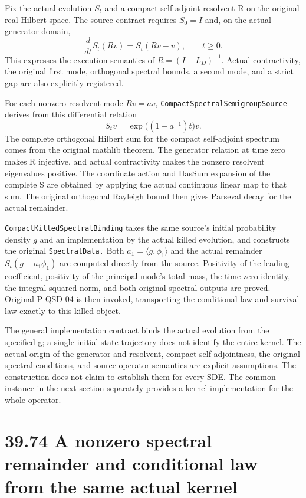 \documentclass[
  english,
  11pt,
  oneside]{book}
\begin{document}
Fix the actual evolution \(S_t\) and a compact self-adjoint resolvent R on the original real Hilbert space. The source contract requires \(S_0=I\) and, on the actual generator domain, \[\frac{d}{dt}S_t(Rv)=S_t(Rv-v),\qquad t\ge0.\] This expresses the execution semantics of \(R=(I-L_D)^{-1}\). Actual contractivity, the original first mode, orthogonal spectral bounds, a second mode, and a strict gap are also explicitly registered.

For each nonzero resolvent mode \(Rv=av\), \nolinkurl{CompactSpectralSemigroupSource} derives from this differential relation \[S_tv=\exp\!\bigl((1-a^{-1})t\bigr)v.\] The complete orthogonal Hilbert sum for the compact self-adjoint spectrum comes from the original mathlib theorem. The generator relation at time zero makes R injective, and actual contractivity makes the nonzero resolvent eigenvalues positive. The coordinate action and HasSum expansion of the complete S are obtained by applying the actual continuous linear map to that sum. The original orthogonal Rayleigh bound then gives Parseval decay for the actual remainder.

\nolinkurl{CompactKilledSpectralBinding} takes the same source's initial probability density \(g\) and an implementation by the actual killed evolution, and constructs the original \nolinkurl{SpectralData.} Both \(a_1=\langle g,\phi_1\rangle\) and the actual remainder \(S_t(g-a_1\phi_1)\) are computed directly from the source. Positivity of the leading coefficient, positivity of the principal mode's total mass, the time-zero identity, the integral squared norm, and both original spectral outputs are proved. Original P-QSD-04 is then invoked, transporting the conditional law and survival law exactly to this killed object.

The general implementation contract binds the actual evolution from the specified g; a single initial-state trajectory does not identify the entire kernel. The actual origin of the generator and resolvent, compact self-adjointness, the original spectral conditions, and source-operator semantics are explicit assumptions. The construction does not claim to establish them for every SDE. The common instance in the next section separately provides a kernel implementation for the whole operator.

\section{39.74 A nonzero spectral remainder and conditional law from the same actual kernel}\label{a-nonzero-spectral-remainder-and-conditional-law-from-the-same-actual-kernel}
\end{document}
